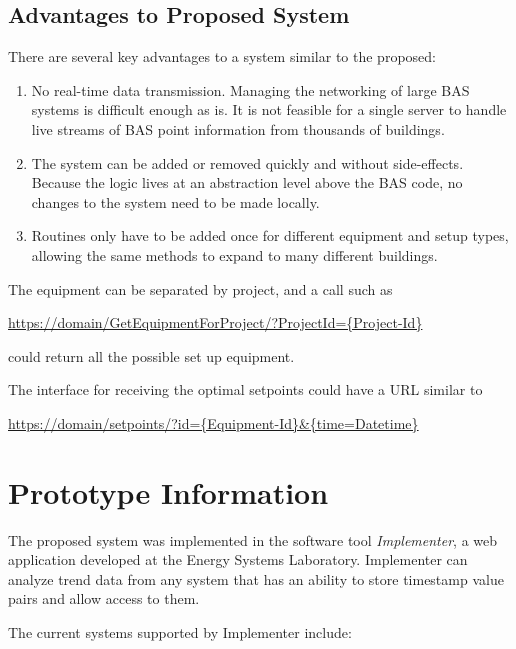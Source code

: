 \subsection{Advantages to Proposed System}

There are several key advantages to a system similar to the proposed:

\begin{enumerate}
    \item No real-time data transmission. Managing the networking of
        large BAS systems is difficult enough as is. It is not feasible
        for a single server to handle live streams of BAS point
        information from thousands of buildings. 

    \item The system can be added or removed quickly and without
        side-effects. Because the logic lives at an abstraction level
        above the BAS code, no changes to the system need to be made
        locally. 

    \item Routines only have to be added once for different equipment
        and setup types, allowing the same methods to expand to many
        different buildings. 
\end{enumerate}

The equipment can be separated by project, and a call such as

\url{https://domain/GetEquipmentForProject/?ProjectId={Project-Id}}

could return all the possible set up equipment.

The interface for receiving the optimal setpoints could have a URL
similar to 

\url{https://domain/setpoints/?id={Equipment-Id}\&{time=Datetime}}

\section{Prototype Information}

The proposed system was implemented in the software tool
\textit{Implementer}, a web application developed at the Energy Systems
Laboratory. Implementer can analyze trend data from any system that has
an ability to store timestamp value pairs and allow access to them. 

The current systems supported by Implementer include:

